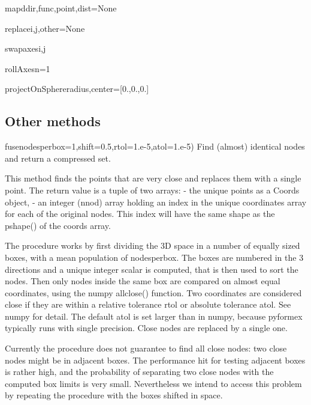 \begin{methoddesc}{mapd}{dir,func,point,dist=None}
\end{methoddesc}

\begin{methoddesc}{replace}{i,j,other=None}
\end{methoddesc}

\begin{methoddesc}{swapaxes}{i,j}
\end{methoddesc}

\begin{methoddesc}{rollAxes}{n=1}
\end{methoddesc}

\begin{methoddesc}{projectOnSphere}{radius,center=[0.,0.,0.]}
\end{methoddesc}



\subsection{Other methods}


\begin{methoddesc}{fuse}{nodesperbox=1,shift=0.5,rtol=1.e-5,atol=1.e-5)}
Find (almost) identical nodes and return a compressed set.

This method finds the points that are very close and replaces them
with a single point. The return value is a tuple of two arrays:
- the unique points as a Coords object,
- an integer (nnod) array holding an index in the unique
coordinates array for each of the original nodes. This index will
have the same shape as the pshape() of the coords array.

The procedure works by first dividing the 3D space in a number of
equally sized boxes, with a mean population of nodesperbox.
The boxes are numbered in the 3 directions and a unique integer scalar
is computed, that is then used to sort the nodes.
Then only nodes inside the same box are compared on almost equal
coordinates, using the numpy allclose() function. Two coordinates are
considered close if they are within a relative tolerance rtol or absolute
tolerance atol. See numpy for detail. The default atol is set larger than
in numpy, because pyformex typically runs with single precision.
Close nodes are replaced by a single one.

Currently the procedure does not guarantee to find all close nodes:
two close nodes might be in adjacent boxes. The performance hit for
testing adjacent boxes is rather high, and the probability of separating
two close nodes with the computed box limits is very small. Nevertheless
we intend to access this problem by repeating the procedure with the
boxes shifted in space.
\end{methoddesc}


